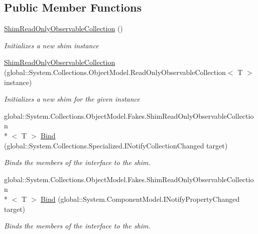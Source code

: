 \subsection*{Public Member Functions}
\begin{DoxyCompactItemize}
\item 
\hyperlink{class_system_1_1_collections_1_1_object_model_1_1_fakes_1_1_shim_read_only_observable_collection_3_01_t_01_4_af2492fe065c7593f5156cc7bdd4e0998}{Shim\-Read\-Only\-Observable\-Collection} ()
\begin{DoxyCompactList}\small\item\em Initializes a new shim instance\end{DoxyCompactList}\item 
\hyperlink{class_system_1_1_collections_1_1_object_model_1_1_fakes_1_1_shim_read_only_observable_collection_3_01_t_01_4_ad8a31aba96a664afe8ac644513976faf}{Shim\-Read\-Only\-Observable\-Collection} (global\-::\-System.\-Collections.\-Object\-Model.\-Read\-Only\-Observable\-Collection$<$ T $>$ instance)
\begin{DoxyCompactList}\small\item\em Initializes a new shim for the given instance\end{DoxyCompactList}\item 
global\-::\-System.\-Collections.\-Object\-Model.\-Fakes.\-Shim\-Read\-Only\-Observable\-Collection\\*
$<$ T $>$ \hyperlink{class_system_1_1_collections_1_1_object_model_1_1_fakes_1_1_shim_read_only_observable_collection_3_01_t_01_4_a1b1b9cd52baaad30c8ba1f01999928d2}{Bind} (global\-::\-System.\-Collections.\-Specialized.\-I\-Notify\-Collection\-Changed target)
\begin{DoxyCompactList}\small\item\em Binds the members of the interface to the shim.\end{DoxyCompactList}\item 
global\-::\-System.\-Collections.\-Object\-Model.\-Fakes.\-Shim\-Read\-Only\-Observable\-Collection\\*
$<$ T $>$ \hyperlink{class_system_1_1_collections_1_1_object_model_1_1_fakes_1_1_shim_read_only_observable_collection_3_01_t_01_4_a73047e88b359bdf823dca837087d35f2}{Bind} (global\-::\-System.\-Component\-Model.\-I\-Notify\-Property\-Changed target)
\begin{DoxyCompactList}\small\item\em Binds the members of the interface to the shim.\end{DoxyCompactList}\item 

\end{DoxyCompactItemize}
